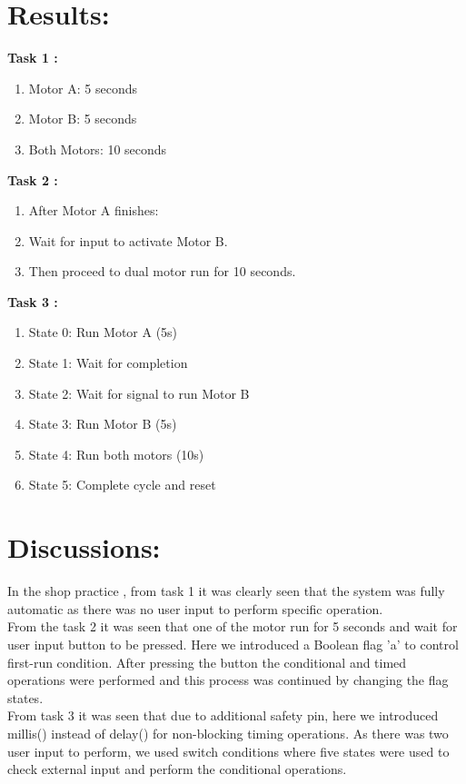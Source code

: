 \documentclass[a4paper,12pt]{article}
\begin{document}
\section*{Results:}
\textbf{Task 1 :} \begin{enumerate}
	\item Motor A: 5 seconds
	
	\item 	Motor B: 5 seconds
	
	\item 	Both Motors: 10 seconds

\end{enumerate}
\textbf{Task 2 :}
\begin{enumerate}
	\item After Motor A finishes:
	
\item	Wait for input to activate Motor B.
	
\item	Then proceed to dual motor run for 10 seconds.
\end{enumerate}
\textbf{Task 3 :}
\begin{enumerate}
	\item State 0: Run Motor A (5s)
	
\item	State 1: Wait for completion
	
\item	State 2: Wait for signal to run Motor B
	
\item	State 3: Run Motor B (5s)
	
\item	State 4: Run both motors (10s)
	
\item	State 5: Complete cycle and reset
\end{enumerate}

	\section*{Discussions:}
	In the shop practice , from task 1 it was clearly seen that the system was fully automatic as there was no user input to perform specific operation.\\
From the task 2 it was seen that one of the motor run for 5 seconds and wait for user input button to be pressed. Here we introduced a Boolean flag 'a' to control first-run condition.
After pressing the button the conditional and timed operations were performed and this process was continued by changing the flag states.\\
From task 3 it was seen that due to additional safety pin, here we introduced millis() instead of delay() for non-blocking timing operations. As there was two user input to perform, we used switch conditions where five states were used to check external input and perform the conditional operations.
\end{document}
